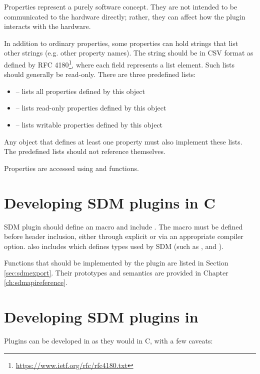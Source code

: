 \documentclass[a4paper,12pt,twoside,extrafontsizes]{memoir}
\begin{document}
Properties represent a purely software concept. They are not intended to be communicated to the hardware directly; rather, they can affect how the plugin interacts with the hardware.

In addition to ordinary properties, some properties can hold strings that list other strings (e.g. other property names). The string should be in CSV format as defined by RFC 4180\footnote{\url{https://www.ietf.org/rfc/rfc4180.txt}}, where each field represents a list element. Such lists should generally be read-only. There are three predefined lists:

\begin{itemize}
	\item \expr{*} -- lists all properties defined by this object
	\item {} -- lists read-only properties defined by this object
	\item {} -- lists writable properties defined by this object
\end{itemize}

Any object that defines at least one property must also implement these lists. The predefined lists should not reference themselves.

Properties are accessed using  and  functions.

\section{Developing SDM plugins in C}
\label{sec:sdmpluginc}

SDM plugin should define an  macro and include . The macro must be defined before header inclusion, either through explicit  or via an appropriate compiler option.  also includes  which defines types used by SDM (such as ,  and ).

Functions that should be implemented by the plugin are listed in Section \ref{sec:sdmexport}. Their prototypes and semantics are provided in Chapter \ref{ch:sdmapireference}.

\section[Developing SDM plugins in C++]{Developing SDM plugins in \cplusplus}

Plugins can be developed in \cplusplus{} as they would in C, with a few caveats:
\end{document}
